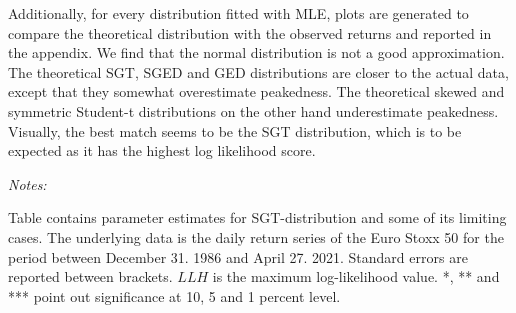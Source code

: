 \documentclass[a4paper, nobind]{templates/ociamthesis}
\begin{document}
\noindent Additionally, for every distribution fitted with MLE, plots are generated to compare the theoretical distribution with the observed returns and reported in the appendix. We find that the normal distribution is not a good approximation. The theoretical SGT, SGED and GED distributions are closer to the actual data, except that they somewhat overestimate peakedness. The theoretical skewed and symmetric Student-t distributions on the other hand underestimate peakedness. Visually, the best match seems to be the SGT distribution, which is to be expected as it has the highest log likelihood score.

\begin{landscape}\begin{table}[h!]

\caption{\label{tab:MLEtable}Maximum likelihood estimates of unconditional distribution functions}
\centering
\begin{threeparttable}
\begin{tablenotes}
\item \textit{Notes:} 
\item Table contains parameter estimates for SGT-distribution and some of its limiting cases. The underlying data is the daily return series of the Euro Stoxx 50 for the period between December 31. 1986 and April 27. 2021. Standard errors are reported between brackets. $LLH$ is the maximum log-likelihood value. *, ** and *** point out significance at 10, 5 and 1 percent level.
\end{tablenotes}
\end{threeparttable}
\end{table}
\end{landscape}
\end{document}
